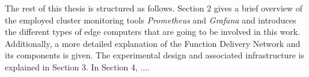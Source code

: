 The rest of this thesis is structured as follows. Section 2 gives a brief overview of the employed cluster monitoring tools \textit{Prometheus} and \textit{Grafana} and introduces the different types of edge computers that are going to be involved in this work. Additionally, a more detailed explanation of the Function Delivery Network and its components is given. The experimental design and associated infrastructure is explained in Section 3. In Section 4, ....